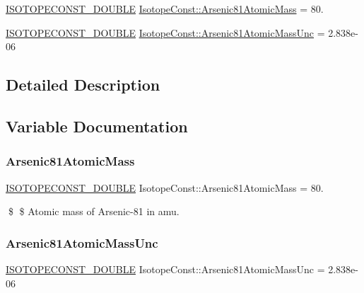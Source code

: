 \begin{DoxyCompactItemize}
\item 
\mbox{\hyperlink{group___isotope_const-_macros_ga8f45a7272ce02c0b4c65c44636ed719a}{I\+S\+O\+T\+O\+P\+E\+C\+O\+N\+S\+T\+\_\+\+D\+O\+U\+B\+LE}} \mbox{\hyperlink{group___isotope_const-_arsenic-_as81_gab27b356b24c0bb1a97d49b34cdc3a796}{Isotope\+Const\+::\+Arsenic81\+Atomic\+Mass}} = 80.
\item 
\mbox{\hyperlink{group___isotope_const-_macros_ga8f45a7272ce02c0b4c65c44636ed719a}{I\+S\+O\+T\+O\+P\+E\+C\+O\+N\+S\+T\+\_\+\+D\+O\+U\+B\+LE}} \mbox{\hyperlink{group___isotope_const-_arsenic-_as81_ga05346c7ea23b86510c2ef90cba1a9538}{Isotope\+Const\+::\+Arsenic81\+Atomic\+Mass\+Unc}} = 2.\+838e-\/06
\end{DoxyCompactItemize}


\subsection{Detailed Description}


\subsection{Variable Documentation}
\mbox{\label{group___isotope_const-_arsenic-_as81_gab27b356b24c0bb1a97d49b34cdc3a796}} 
\subsubsection{\texorpdfstring{Arsenic81\+Atomic\+Mass}{Arsenic81AtomicMass}}
{\footnotesize\ttfamily \mbox{\hyperlink{group___isotope_const-_macros_ga8f45a7272ce02c0b4c65c44636ed719a}{I\+S\+O\+T\+O\+P\+E\+C\+O\+N\+S\+T\+\_\+\+D\+O\+U\+B\+LE}} Isotope\+Const\+::\+Arsenic81\+Atomic\+Mass = 80.}

\$ \$ Atomic mass of Arsenic-\/81 in amu. \mbox{\label{group___isotope_const-_arsenic-_as81_ga05346c7ea23b86510c2ef90cba1a9538}} 
\subsubsection{\texorpdfstring{Arsenic81\+Atomic\+Mass\+Unc}{Arsenic81AtomicMassUnc}}
{\footnotesize\ttfamily \mbox{\hyperlink{group___isotope_const-_macros_ga8f45a7272ce02c0b4c65c44636ed719a}{I\+S\+O\+T\+O\+P\+E\+C\+O\+N\+S\+T\+\_\+\+D\+O\+U\+B\+LE}} Isotope\+Const\+::\+Arsenic81\+Atomic\+Mass\+Unc = 2.\+838e-\/06}

